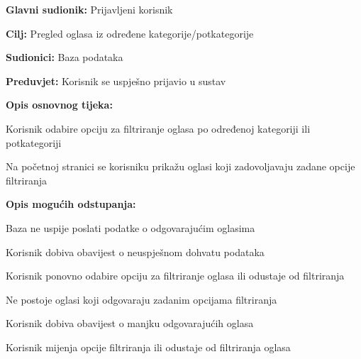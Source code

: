 					\eject
					\noindent {}
					\begin{packed_item}
	
						\item \textbf{Glavni sudionik: }Prijavljeni korisnik
						\item  \textbf{Cilj:} Pregled oglasa iz određene kategorije/potkategorije
						\item  \textbf{Sudionici:} Baza podataka
						\item  \textbf{Preduvjet:} Korisnik se uspješno prijavio u sustav
						\item  \textbf{Opis osnovnog tijeka:}
						
						\item[] \begin{packed_enum}
							\item Korisnik odabire opciju za filtriranje oglasa po određenoj kategoriji ili potkategoriji
							\item Na početnoj stranici se korisniku prikažu oglasi koji zadovoljavaju zadane opcije filtriranja
						\end{packed_enum}

						\item  \textbf{Opis mogućih odstupanja:}

						\item[] \begin{packed_item}
							\item[2.a] Baza ne uspije poslati podatke o odgovarajućim oglasima
							\item[] \begin{packed_enum}
								
								\item Korisnik dobiva obavijest o neuspješnom dohvatu podataka
								\item Korisnik ponovno odabire opciju za filtriranje oglasa ili odustaje od filtriranja
							
							\end{packed_enum}	

							\item[2.b] Ne postoje oglasi koji odgovaraju zadanim opcijama filtriranja
							\item[] \begin{packed_enum}
								
								\item Korisnik dobiva obavijest o manjku odgovarajućih oglasa
								\item Korisnik mijenja opcije filtriranja ili odustaje od filtriranja oglasa
							
							\end{packed_enum}	

						\end{packed_item}
						
					\end{packed_item}

